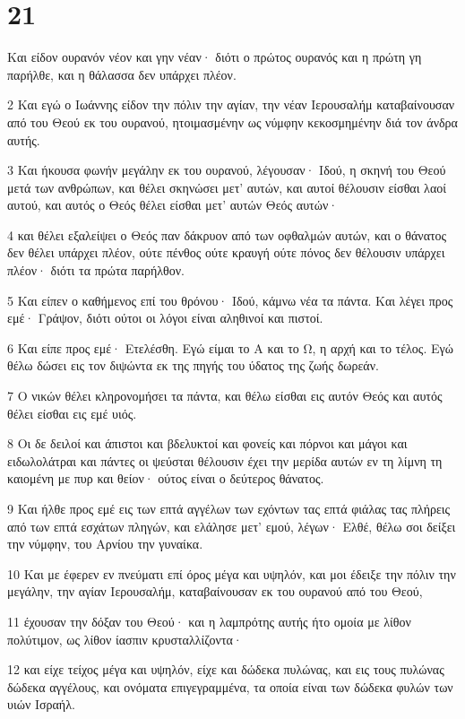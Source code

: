 \chapter{21}

\par Και είδον ουρανόν νέον και γην νέαν· διότι ο πρώτος ουρανός και η πρώτη γη παρήλθε, και η θάλασσα δεν υπάρχει πλέον.
\par 2 Και εγώ ο Ιωάννης είδον την πόλιν την αγίαν, την νέαν Ιερουσαλήμ καταβαίνουσαν από του Θεού εκ του ουρανού, ητοιμασμένην ως νύμφην κεκοσμημένην διά τον άνδρα αυτής.
\par 3 Και ήκουσα φωνήν μεγάλην εκ του ουρανού, λέγουσαν· Ιδού, η σκηνή του Θεού μετά των ανθρώπων, και θέλει σκηνώσει μετ' αυτών, και αυτοί θέλουσιν είσθαι λαοί αυτού, και αυτός ο Θεός θέλει είσθαι μετ' αυτών Θεός αυτών·
\par 4 και θέλει εξαλείψει ο Θεός παν δάκρυον από των οφθαλμών αυτών, και ο θάνατος δεν θέλει υπάρχει πλέον, ούτε πένθος ούτε κραυγή ούτε πόνος δεν θέλουσιν υπάρχει πλέον· διότι τα πρώτα παρήλθον.
\par 5 Και είπεν ο καθήμενος επί του θρόνου· Ιδού, κάμνω νέα τα πάντα. Και λέγει προς εμέ· Γράψον, διότι ούτοι οι λόγοι είναι αληθινοί και πιστοί.
\par 6 Και είπε προς εμέ· Ετελέσθη. Εγώ είμαι το Α και το Ω, η αρχή και το τέλος. Εγώ θέλω δώσει εις τον διψώντα εκ της πηγής του ύδατος της ζωής δωρεάν.
\par 7 Ο νικών θέλει κληρονομήσει τα πάντα, και θέλω είσθαι εις αυτόν Θεός και αυτός θέλει είσθαι εις εμέ υιός.
\par 8 Οι δε δειλοί και άπιστοι και βδελυκτοί και φονείς και πόρνοι και μάγοι και ειδωλολάτραι και πάντες οι ψεύσται θέλουσιν έχει την μερίδα αυτών εν τη λίμνη τη καιομένη με πυρ και θείον· ούτος είναι ο δεύτερος θάνατος.
\par 9 Και ήλθε προς εμέ εις των επτά αγγέλων των εχόντων τας επτά φιάλας τας πλήρεις από των επτά εσχάτων πληγών, και ελάλησε μετ' εμού, λέγων· Ελθέ, θέλω σοι δείξει την νύμφην, του Αρνίου την γυναίκα.
\par 10 Και με έφερεν εν πνεύματι επί όρος μέγα και υψηλόν, και μοι έδειξε την πόλιν την μεγάλην, την αγίαν Ιερουσαλήμ, καταβαίνουσαν εκ του ουρανού από του Θεού,
\par 11 έχουσαν την δόξαν του Θεού· και η λαμπρότης αυτής ήτο ομοία με λίθον πολύτιμον, ως λίθον ίασπιν κρυσταλλίζοντα·
\par 12 και είχε τείχος μέγα και υψηλόν, είχε και δώδεκα πυλώνας, και εις τους πυλώνας δώδεκα αγγέλους, και ονόματα επιγεγραμμένα, τα οποία είναι των δώδεκα φυλών των υιών Ισραήλ.
